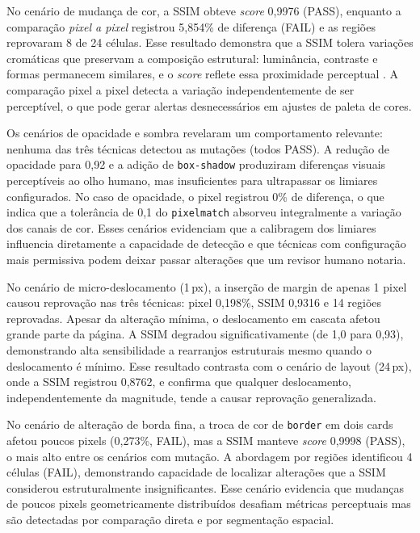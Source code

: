 \documentclass{UNESC}
\begin{document}
No cenário de mudança de cor, a SSIM obteve \emph{score} 0,9976 (PASS), enquanto a comparação \emph{pixel a pixel} registrou 5,854\% de diferença (FAIL) e as regiões reprovaram 8 de 24 células. Esse resultado demonstra que a SSIM tolera variações cromáticas que preservam a composição estrutural: luminância, contraste e formas permanecem similares, e o \emph{score} reflete essa proximidade perceptual \cite{wang2004}. A comparação pixel a pixel detecta a variação independentemente de ser perceptível, o que pode gerar alertas desnecessários em ajustes de paleta de cores.

Os cenários de opacidade e sombra revelaram um comportamento relevante: nenhuma das três técnicas detectou as mutações (todos PASS). A redução de opacidade para 0,92 e a adição de \texttt{box-shadow} produziram diferenças visuais perceptíveis ao olho humano, mas insuficientes para ultrapassar os limiares configurados. No caso de opacidade, o pixel registrou 0\% de diferença, o que indica que a tolerância de 0,1 do \texttt{pixelmatch} absorveu integralmente a variação dos canais de cor. Esses cenários evidenciam que a calibragem dos limiares influencia diretamente a capacidade de detecção e que técnicas com configuração mais permissiva podem deixar passar alterações que um revisor humano notaria.

No cenário de micro-deslocamento (1\,px), a inserção de margin de apenas 1 pixel causou reprovação nas três técnicas: pixel 0,198\%, SSIM 0,9316 e 14 regiões reprovadas. Apesar da alteração mínima, o deslocamento em cascata afetou grande parte da página. A SSIM degradou significativamente (de 1,0 para 0,93), demonstrando alta sensibilidade a rearranjos estruturais mesmo quando o deslocamento é mínimo. Esse resultado contrasta com o cenário de layout (24\,px), onde a SSIM registrou 0,8762, e confirma que qualquer deslocamento, independentemente da magnitude, tende a causar reprovação generalizada.

No cenário de alteração de borda fina, a troca de cor de \texttt{border} em dois cards afetou poucos pixels (0,273\%, FAIL), mas a SSIM manteve \emph{score} 0,9998 (PASS), o mais alto entre os cenários com mutação. A abordagem por regiões identificou 4 células (FAIL), demonstrando capacidade de localizar alterações que a SSIM considerou estruturalmente insignificantes. Esse cenário evidencia que mudanças de poucos pixels geometricamente distribuídos desafiam métricas perceptuais mas são detectadas por comparação direta e por segmentação espacial.
\end{document}
